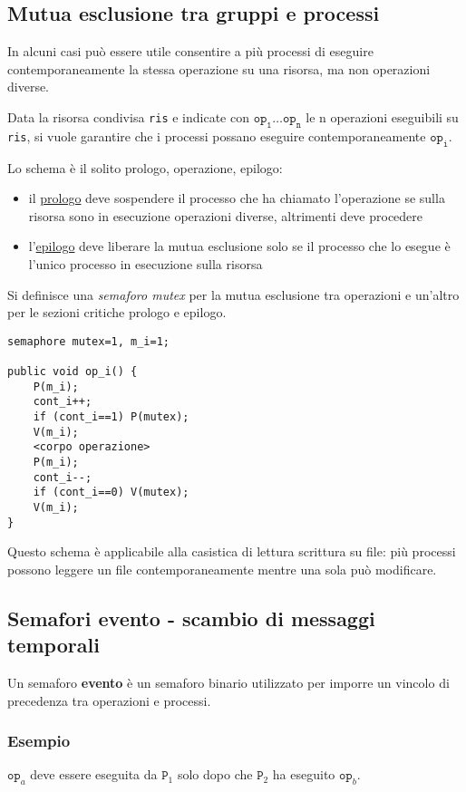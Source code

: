 \subsection{Mutua esclusione tra gruppi e processi}
In alcuni casi può essere utile consentire a più processi di eseguire contemporaneamente la stessa operazione su una risorsa, ma non operazioni diverse.

Data la risorsa condivisa \texttt{ris} e indicate con $\texttt{op}_\texttt{1} \dots \texttt{op}_\texttt{n}$ le n operazioni eseguibili su \texttt{ris}, si vuole garantire che i processi possano eseguire contemporaneamente $\texttt{op}_\texttt{i}$.

Lo schema è il solito prologo, operazione, epilogo:
\begin{itemize}
    \item il \underline{prologo} deve sospendere il processo che ha chiamato l'operazione se sulla risorsa sono in esecuzione operazioni diverse, altrimenti deve procedere
    \item l'\underline{epilogo} deve liberare la mutua esclusione solo se il processo che lo esegue è l'unico processo in esecuzione sulla risorsa
\end{itemize}

Si definisce una \textit{semaforo mutex} per la mutua esclusione tra operazioni e un'altro per le sezioni critiche prologo e epilogo.

\begin{verbatim}
semaphore mutex=1, m_i=1;

public void op_i() {
    P(m_i);
    cont_i++;
    if (cont_i==1) P(mutex);
    V(m_i);
    <corpo operazione>
    P(m_i);
    cont_i--;
    if (cont_i==0) V(mutex);
    V(m_i);
}
\end{verbatim}

Questo schema è applicabile alla casistica di lettura scrittura su file: più processi possono leggere un file contemporaneamente mentre una sola può modificare.

\subsection{Semafori evento - scambio di messaggi temporali}
Un semaforo \textbf{evento} è un semaforo binario utilizzato per imporre un vincolo di precedenza tra operazioni e processi.

\subsubsection{Esempio}
$\texttt{op}_a$ deve essere eseguita da $\texttt{P}_1$ solo dopo che $\texttt{P}_2$ ha eseguito $\texttt{op}_b$.

